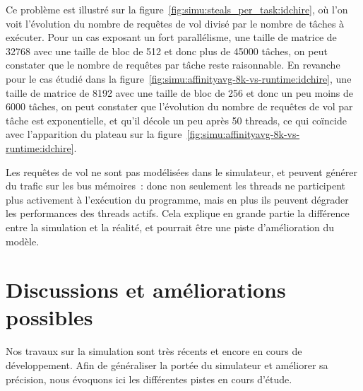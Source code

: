 Ce problème est illustré sur la figure~\ref{fig:simu:steals_per_task:idchire}, où l'on voit l'évolution du nombre de requêtes de vol divisé par le nombre de tâches à exécuter.
Pour un cas exposant un fort parallélisme, une taille de matrice de 32768 avec une taille de bloc de 512 et donc plus de 45000 tâches, on peut constater que le nombre de requêtes par tâche reste raisonnable.
En revanche pour le cas étudié dans la figure~\ref{fig:simu:affinityavg-8k-vs-runtime:idchire}, une taille de matrice de 8192 avec une taille de bloc de 256 et donc un peu moins de 6000 tâches, on peut constater que l'évolution du nombre de requêtes de vol par tâche est exponentielle, et qu'il décole un peu après 50 threads, ce qui coïncide avec l'apparition du plateau sur la figure~\ref{fig:simu:affinityavg-8k-vs-runtime:idchire}.

Les requêtes de vol ne sont pas modélisées dans le simulateur, et peuvent générer du trafic sur les bus mémoires~: donc non seulement les threads ne participent plus activement à l'exécution du programme, mais en plus ils peuvent dégrader les performances des threads actifs.
Cela explique en grande partie la différence entre la simulation et la réalité, et pourrait être une piste d'amélioration du modèle.








\section{Discussions et améliorations possibles}\label{sec:simulation:next}

Nos travaux sur la simulation sont très récents et encore en cours de développement.
Afin de généraliser la portée du simulateur et améliorer sa précision, nous évoquons ici les différentes pistes en cours d'étude.

